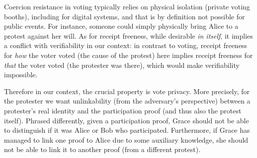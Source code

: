Coercion resistance in voting typically relies on physical isolation
(\eg private voting booths), including for digital systems, 
and that is by definition not possible for public events.
For instance, someone could simply physically bring Alice to a protest against her will.
As for receipt freeness, while
desirable \emph{in itself}, it implies a conflict with verifiability in our context:
in contrast to voting, receipt freeness for \emph{how} the voter voted (\ie the 
cause of the protest) here implies receipt freeness for \emph{that} the voter voted 
(\ie the protester was there), which would make verifiability impossible.

Therefore in our context, the crucial property is  vote privacy.
More precisely, for the protester we want unlinkability (from the adversary's 
perspective) between a protester's real identity and the participation proof 
(and thus also the protest itself).
Phrased differently, given a participation proof, Grace should not be able to 
distinguish if it was Alice or Bob who participated.
Furthermore, if Grace has managed to link one proof to Alice due to some 
auxiliary knowledge, she should not be able to link it to another proof (from a different protest).

